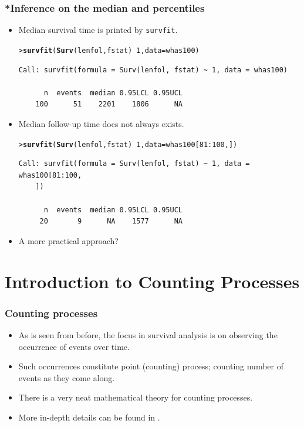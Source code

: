 \documentclass[10pt]{beamer}\usepackage[]{graphicx}\usepackage[]{color}
\makeatletter
\newcommand{\hlnum}[1]{\textcolor[rgb]{0.686,0.059,0.569}{#1}}%
\newcommand{\hlopt}[1]{\textcolor[rgb]{0,0,0}{#1}}%
\newcommand{\hlstd}[1]{\textcolor[rgb]{0.345,0.345,0.345}{#1}}%
\newcommand{\hlkwc}[1]{\textcolor[rgb]{0.333,0.667,0.333}{#1}}%
\newcommand{\hlkwd}[1]{\textcolor[rgb]{0.737,0.353,0.396}{\textbf{#1}}}%
\newenvironment{kframe}{%
 \def\at@end@of@kframe{}%
 \ifinner\ifhmode%
  \def\at@end@of@kframe{\end{minipage}}%
  \begin{minipage}{\columnwidth}%
 \fi\fi%
 \def\FrameCommand##1{\hskip\@totalleftmargin \hskip-\fboxsep
 \colorbox{shadecolor}{##1}\hskip-\fboxsep
     \hskip-\linewidth \hskip-\@totalleftmargin \hskip\columnwidth}%
 \MakeFramed {\advance\hsize-\width
   \@totalleftmargin\z@ \linewidth\hsize
   \@setminipage}}%
 {\par\unskip\endMakeFramed%
 \at@end@of@kframe}
\newenvironment{knitrout}{}{} %
\renewenvironment{knitrout}{\setlength{\topsep}{-.2mm}}{}
\newcommand{\code}[1]{{\texttt{#1}}}
\makeatother
\begin{document}
\begin{frame}[fragile]
  \frametitle{*Inference on the median and percentiles}
  \begin{itemize}  
  \item Median survival time is printed by \code{survfit}.
\begin{knitrout}\scriptsize
{}\color{fgcolor}\begin{kframe}
\begin{alltt}
\hlstd{> }\hlkwd{survfit}\hlstd{(}\hlkwd{Surv}\hlstd{(lenfol, fstat)} \hlopt{~} \hlnum{1}\hlstd{,} \hlkwc{data} \hlstd{= whas100)}
\end{alltt}
\begin{verbatim}
Call: survfit(formula = Surv(lenfol, fstat) ~ 1, data = whas100)

      n  events  median 0.95LCL 0.95UCL 
    100      51    2201    1806      NA 
\end{verbatim}
\end{kframe}
\end{knitrout}
  \item Median follow-up time does not always exists.
\begin{knitrout}\scriptsize
{}\color{fgcolor}\begin{kframe}
\begin{alltt}
\hlstd{> }\hlkwd{survfit}\hlstd{(}\hlkwd{Surv}\hlstd{(lenfol, fstat)} \hlopt{~} \hlnum{1}\hlstd{,} \hlkwc{data} \hlstd{= whas100[}\hlnum{81}\hlopt{:}\hlnum{100}\hlstd{,])}
\end{alltt}
\begin{verbatim}
Call: survfit(formula = Surv(lenfol, fstat) ~ 1, data = whas100[81:100, 
    ])

      n  events  median 0.95LCL 0.95UCL 
     20       9      NA    1577      NA 
\end{verbatim}
\end{kframe}
\end{knitrout}
  \item A more practical approach?
  \end{itemize}
\end{frame}

\section{Introduction to Counting Processes}
\begin{frame}
  \frametitle{Counting processes}
  \begin{itemize}  
  \item As is seen from before, the focus in survival analysis is on observing the occurrence of events over time. 
  \item Such occurrences constitute point (counting) process; counting number of events as they come along. 
  \item There is a very neat mathematical theory for counting processes.
  \item More in-depth details can be found in \citet{fleming2011counting,kalbfleisch2011statistical}.
  \end{itemize}    
\end{frame}
\end{document}
